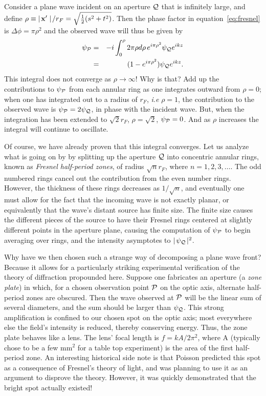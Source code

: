 \documentclass{article}
\newcommand{\bua}{\begin{eqnarray*}}
\newcommand{\eua}{\end{eqnarray*}}
\def\labs{\mid\!}
\def\rabs{\!\mid}
\begin{document}
Consider a plane wave incident on an aperture $\cal{Q}$ that is infinitely 
large, and define 
$\rho\equiv{\labs{\bf x'}\labs/r_F}=\sqrt{{1\over 2}(s^2+t^2)}$. Then the 
phase factor in equation~\ref{eq:fresnel} is $\Delta\phi=\pi\rho^2$ and the
observed wave will thus be given by
\bua
\psi_{\cal{P}}&=&-i\int_0^\rho 2\pi\rho d\rho\,e^{i\pi\rho^2}\psi_{\cal{Q}}e^{ikz}\\
              &=&(1-e^{i\pi\rho^2})\psi_{\cal{Q}}e^{ikz}.
\eua
This integral does not converge as $\rho\rightarrow\infty$! Why is that? Add 
up the contributions to $\psi_{\cal{P}}$ from each annular ring as one integrates
outward from $\rho=0$; when one has integrated out to a radius of $r_F$, {\it i.e}
$\rho=1$, the contribution to the observed wave is $\psi_{\cal{P}}=2\psi_{\cal{Q}}$,
in phase with the incident wave. But, when the integration has been extended
to $\sqrt{2}r_F$, $\rho=\sqrt{2}$, $\psi_{\cal{P}}=0$. And as $\rho$ increases
the integral will continue to oscillate. 

Of course, we have already proven that this integral converges. Let us analyze 
what is going on by by splitting up the aperture $\cal{Q}$ into concentric
annular rings, known as {\it Fresnel half-period zones}, of radius $\sqrt{n}r_F$,
where $n=1,2,3,\ldots$. The odd numbered rings cancel out the contribution from
the even number rings. However, the thickness of these rings decreases as 
$1/\sqrt{n}$, and eventually one must allow for the fact that the incoming wave
is not exactly planar, or equivalently that the wave's distant source has 
finite size. The finite size causes the different pieces of the source to have 
their Fresnel rings centered at slightly different points in the aperture plane,
causing the computation of $\psi_{\cal{P}}$ to begin averaging over rings, and 
the intensity asymptotes to $\labs\psi_{\cal{Q}}\rabs^2$.

Why have we then chosen such a strange way of decomposing a plane wave front? 
Because it allows for a particularly striking experimental verification of the
theory of diffraction propounded here. Suppose one fabricates an aperture 
(a {\it zone plate}) in which, for a chosen observation point $\cal{P}$ on the 
optic axis, alternate half-period zones are obscured. Then the wave 
observed at $\cal{P}$ will be the linear sum of several diameters, and the sum
should be larger than $\psi_{\cal{Q}}$. This strong amplification is confined to
our chosen spot on the optic axis; most everywhere else the field's intensity
is reduced, thereby conserving energy. 
Thus, the zone plate behaves like a lens. 
The lens' focal length is $f={kA/2\pi^2}$, where A (typically chose to be a 
few mm$^2$ for a table top experiment) is the area of the first half-period 
zone. An interesting historical side note is that Poisson predicted this spot
as a consequence of Fresnel's theory of light, and was planning to use it
as an argument to disprove the theory. However, it was quickly demonstrated 
that the bright spot actually existed!
\end{document}
